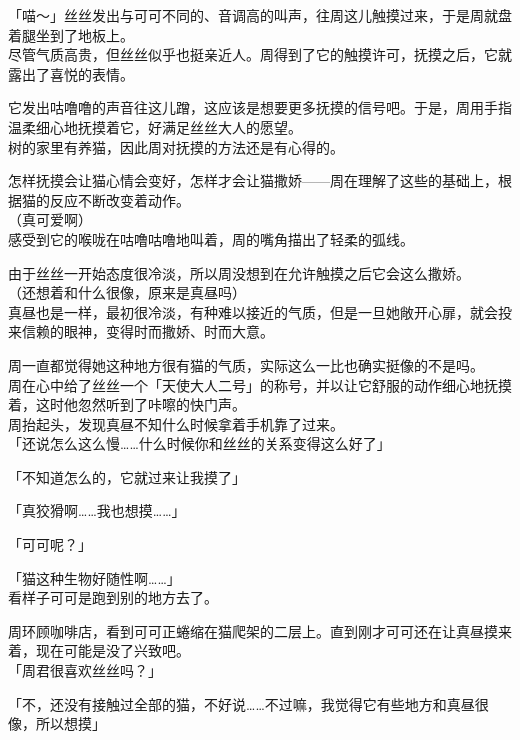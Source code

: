「喵～」丝丝发出与可可不同的、音调高的叫声，往周这儿触摸过来，于是周就盘着腿坐到了地板上。\\

尽管气质高贵，但丝丝似乎也挺亲近人。周得到了它的触摸许可，抚摸之后，它就露出了喜悦的表情。

它发出咕噜噜的声音往这儿蹭，这应该是想要更多抚摸的信号吧。于是，周用手指温柔细心地抚摸着它，好满足丝丝大人的愿望。\\

树的家里有养猫，因此周对抚摸的方法还是有心得的。

怎样抚摸会让猫心情会变好，怎样才会让猫撒娇——周在理解了这些的基础上，根据猫的反应不断改变着动作。\\

（真可爱啊）\\

感受到它的喉咙在咕噜咕噜地叫着，周的嘴角描出了轻柔的弧线。

由于丝丝一开始态度很冷淡，所以周没想到在允许触摸之后它会这么撒娇。\\

（还想着和什么很像，原来是真昼吗）\\

真昼也是一样，最初很冷淡，有种难以接近的气质，但是一旦她敞开心扉，就会投来信赖的眼神，变得时而撒娇、时而大意。

周一直都觉得她这种地方很有猫的气质，实际这么一比也确实挺像的不是吗。\\

周在心中给了丝丝一个「天使大人二号」的称号，并以让它舒服的动作细心地抚摸着，这时他忽然听到了咔嚓的快门声。\\

周抬起头，发现真昼不知什么时候拿着手机靠了过来。\\

「还说怎么这么慢……什么时候你和丝丝的关系变得这么好了」

「不知道怎么的，它就过来让我摸了」

「真狡猾啊……我也想摸……」

「可可呢？」

「猫这种生物好随性啊……」\\

看样子可可是跑到别的地方去了。

周环顾咖啡店，看到可可正蜷缩在猫爬架的二层上。直到刚才可可还在让真昼摸来着，现在可能是没了兴致吧。\\

「周君很喜欢丝丝吗？」

「不，还没有接触过全部的猫，不好说……不过嘛，我觉得它有些地方和真昼很像，所以想摸」

